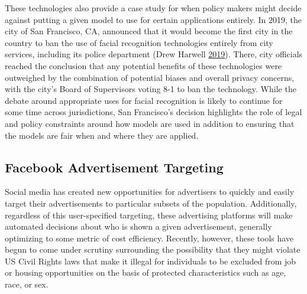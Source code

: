 \documentclass[]{krantz}
\begin{document}
These technologies also provide a case study for when policy makers
might decide against putting a given model to use for certain
applications entirely. In 2019, the city of San Francisco, CA, announced
that it would become the first city in the country to ban the use of
facial recognition technologies entirely from city services, including
its police department (Drew Harwell
\protect\hyperlink{ref-harwell2019}{2019}). There, city officials
reached the conclusion that any potential benefits of these technologies
were outweighed by the combination of potential biases and overall
privacy concerns, with the city's Board of Supervisors voting 8-1 to ban
the technology. While the debate around appropriate uses for facial
recognition is likely to continue for some time across jurisdictions,
San Francisco's decision highlights the role of legal and policy
constraints around how models are used in addition to ensuring that the
models are fair when and where they are applied.

\subsection{Facebook Advertisement
Targeting}\label{facebook-advertisement-targeting}

Social media has created new opportunities for advertisers to quickly
and easily target their advertisements to particular subsets of the
population. Additionally, regardless of this user-specified targeting,
these advertising platforms will make automated decisions about who is
shown a given advertisement, generally optimizing to some metric of cost
efficiency. Recently, however, these tools have begun to come under
scrutiny surrounding the possibility that they might violate US Civil
Rights laws that make it illegal for individuals to be excluded from job
or housing opportunities on the basis of protected characteristics such
as age, race, or sex.
\end{document}
